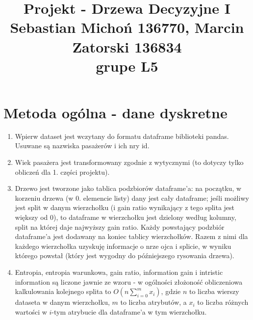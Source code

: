 \documentclass[12pt]{article}
\begin{document}
\title{Projekt - Drzewa Decyzyjne I\\
\large Sebastian Michoń 136770, Marcin Zatorski 136834\\
\large grupe L5}
\date{\vspace{-10ex}}
\maketitle

\section{Metoda ogólna - dane dyskretne}
\begin{enumerate}
	\item Wpierw dataset jest wczytany do formatu dataframe biblioteki pandas. Usuwane są nazwiska pasażerów i ich nry id.
	
	\item Wiek pasażera jest transformowany zgodnie z wytycznymi (to dotyczy tylko obliczeń dla 1. części projektu).
	
	\item Drzewo jest tworzone jako tablica podzbiorów dataframe'a: na początku, w korzeniu drzewa (w 0. elemencie listy) dany jest cały dataframe; jeśli możliwy jest split w danym wierzchołku (i gain ratio wynikający z tego splita jest większy od 0), to dataframe w wierzchołku jest dzielony według kolumny, split na której daje najwyższy gain ratio. Każdy powstający podzbiór dataframe'a jest dodawany na koniec tablicy wierzchołków. Razem z nimi dla każdego wierzchołka uzyskuję informacje o nrze ojca i splicie, w wyniku którego powstał (który jest wygodny do późniejszego rysowania drzewa).
	
	\item Entropia, entropia warunkowa, gain ratio, information gain i intristic information są liczone jawnie ze wzoru - w ogólności złożoność obliczeniowa kalkulowania kolejnego splita to \(O(n\sum_{i=0}^{m}{x_i})\), gdzie \(n\) to liczba wierszy dataseta w danym wierzchołku, \(m\) to liczba atrybutów, a \(x_i\) to liczba różnych wartości w \(i\)-tym atrybucie dla dataframe'a w tym wierzchołku.
	

\end{enumerate}
\end{document}
